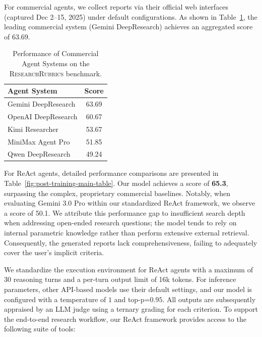 For commercial agents, we collect reports via their official web interfaces (captured Dec 2--15, 2025) under default configurations. As shown in Table~\ref{tab:commercial_systems}, the leading commercial system (Gemini DeepResearch) achieves an aggregated score of 63.69.

\begin{table}[h]
    \centering
    \renewcommand{\arraystretch}{1.2}
    \begin{tabular}{lc}
        \toprule
        \rowcolor{header_gray}
        \textbf{Agent System} & \textbf{Score} \\
        \midrule
        Gemini DeepResearch & 63.69 \\
        OpenAI DeepResearch & 60.67 \\
        Kimi Researcher & 53.67 \\
        MiniMax Agent Pro & 51.85 \\
        Qwen DeepResearch & 49.24 \\
        \bottomrule
    \end{tabular}
    \caption{Performance of Commercial Agent Systems on the \textsc{ResearchRubrics} benchmark.}
    \label{tab:commercial_systems}
\end{table}

For ReAct agents, detailed performance comparisons are presented in Table~\ref{fig:post-training-main-table}. Our model achieves a score of \textbf{65.3}, surpassing the complex, proprietary commercial baselines. Notably, when evaluating Gemini 3.0 Pro within our standardized ReAct framework, we observe a score of 50.1. We attribute this performance gap to insufficient search depth when addressing open-ended research questions; the model tends to rely on internal parametric knowledge rather than perform extensive external retrieval. Consequently, the generated reports lack comprehensiveness, failing to adequately cover the user's implicit criteria.

We standardize the execution environment for ReAct agents with a maximum of 30 reasoning turns and a per-turn output limit of 16k tokens. For inference parameters, other API-based models use their default settings, and our model is configured with a temperature of $1$ and top-p=$0.95$. All outputs are subsequently appraised by an LLM judge using a ternary grading for each criterion. To support the end-to-end research workflow, our ReAct framework provides access to the following suite of tools:

